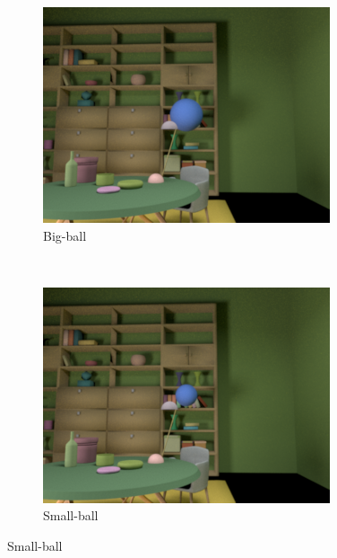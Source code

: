 \documentclass{jov}
\begin{document}
\begin{figure}[h]
\centering
\begin{subfigure}[b]{0.22 \textwidth}
        \includegraphics[width=\textwidth]{../Figures/Figure10/Figure10_a.png}
        \caption{Big-ball}
        \label{fig:libraryWithBigBall}
    \end{subfigure}
    ~ %
\begin{subfigure}[b]{0.22 \textwidth}
        \includegraphics[width=\textwidth]{../Figures/Figure10/Figure10_b.png}
        \caption{Small-ball}
        \label{fig:libraryWithSmallBall}
    \end{subfigure}

\end{figure}
\end{document}
